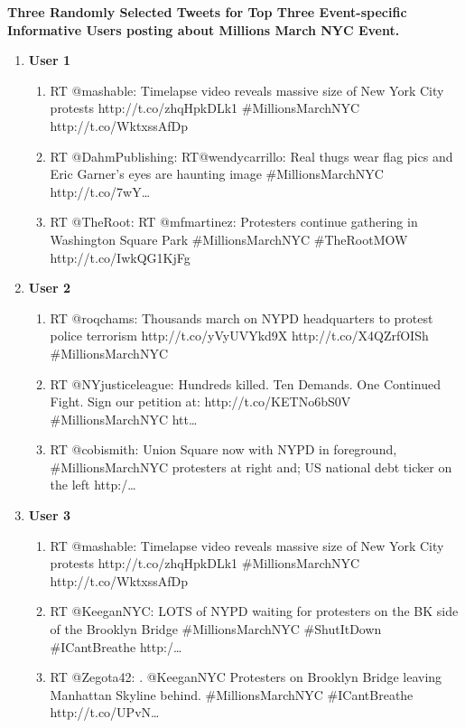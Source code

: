 \textbf{Three Randomly Selected Tweets for Top Three Event-specific Informative Users posting about Millions March NYC Event.}
\begin{enumerate}
\item \textbf{User 1}
\begin{enumerate}
\item RT @mashable: Timelapse video reveals massive size of New York City protests http://t.co/zhqHpkDLk1 \#MillionsMarchNYC http://t.co/WktxssAfDp
\item RT @DahmPublishing: RT@wendycarrillo: Real thugs wear flag pics and Eric Garner's eyes are haunting image \#MillionsMarchNYC http://t.co/7wY…
\item RT @TheRoot: RT @mfmartinez: Protesters continue gathering in Washington Square Park \#MillionsMarchNYC \#TheRootMOW http://t.co/IwkQG1KjFg
\end{enumerate}

\item \textbf{User 2}
\begin{enumerate}
\item RT @roqchams: Thousands march on NYPD headquarters to protest police terrorism http://t.co/yVyUVYkd9X http://t.co/X4QZrfOISh \#MillionsMarchNYC
\item RT @NYjusticeleague: Hundreds killed. Ten Demands. One Continued Fight.  Sign our petition at: http://t.co/KETNo6bS0V \#MillionsMarchNYC htt…
\item RT @cobismith: Union Square now with NYPD in foreground, \#MillionsMarchNYC protesters at right and; US national debt ticker on the left http:/…
\end{enumerate}

\item \textbf{User 3}
\begin{enumerate}
\item RT @mashable: Timelapse video reveals massive size of New York City protests http://t.co/zhqHpkDLk1 \#MillionsMarchNYC http://t.co/WktxssAfDp
\item RT @KeeganNYC: LOTS of NYPD waiting for protesters on the BK side of the Brooklyn Bridge \#MillionsMarchNYC \#ShutItDown \#ICantBreathe http:/…
\item RT @Zegota42: . @KeeganNYC Protesters on Brooklyn Bridge leaving Manhattan Skyline behind. \#MillionsMarchNYC \#ICantBreathe http://t.co/UPvN…
\end{enumerate}

\end{enumerate}



